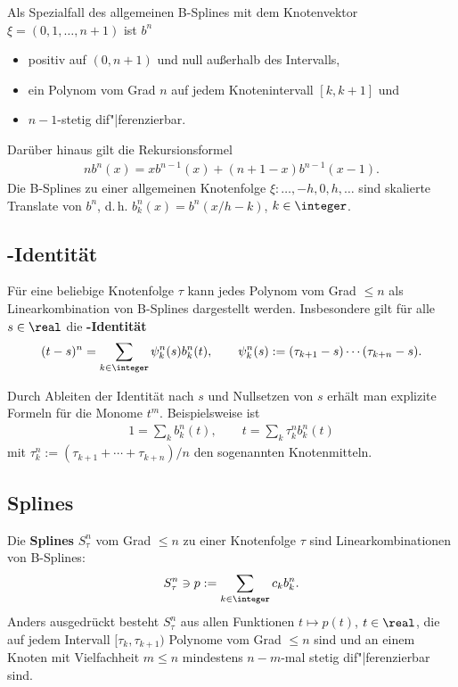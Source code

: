 \linie

Als Spezialfall des allgemeinen B-Splines mit dem Knotenvektor
$\xi = (0, 1, \dotsc, n + 1)$ ist $b^n$
\begin{itemize}
    \item
    positiv auf $(0, n + 1)$ und null außerhalb des Intervalls,

    \item
    ein Polynom vom Grad $n$ auf jedem Knotenintervall $[k, k + 1]$ und

    \item
    $n - 1$-stetig dif"|ferenzierbar.
\end{itemize}
Darüber hinaus gilt die Rekursionsformel
\begin{align*}
    n b^n(x) = x b^{n-1}(x) + (n + 1 - x) b^{n-1}(x - 1).
\end{align*}
Die B-Splines zu einer allgemeinen Knotenfolge
$\xi\colon \dotsc, -h, 0, h, \dotsc$
sind skalierte Translate von $b^n$, d.\,h. $b_k^n(x) = b^n(x/h - k)$,
$k \in \integer$.

\subsection{%
    -Identität%
}

Für eine beliebige Knotenfolge $\tau$ kann jedes Polynom vom Grad $\le n$
als Linearkombination von B-Splines dargestellt werden.
Insbesondere gilt für alle $s \in \real$ die \textbf{-Identität}
\begin{align*}
    (t - s)^n = \sum_{k \in \integer} \psi_k^n(s) b_k^n(t), \qquad
    \psi_k^n(s) := (\tau_{k+1} - s) \dotsm (\tau_{k+n} - s).
\end{align*}

Durch Ableiten der Identität nach $s$ und Nullsetzen von $s$ erhält man
explizite Formeln für die Monome $t^m$.
Beispielsweise ist
\begin{align*}
    1 = \sum_k b_k^n(t), \qquad
    t = \sum_k \tau_k^n b_k^n(t)
\end{align*}
mit $\tau_k^n := (\tau_{k+1} + \dotsb + \tau_{k+n}) / n$ den sogenannten
Knotenmitteln.

\subsection{%
    Splines%
}

Die \textbf{Splines} $S_\tau^n$ vom Grad $\le n$ zu einer Knotenfolge $\tau$
sind Linearkombinationen von B-Splines:
\begin{align*}
    S_\tau^n \ni p := \sum_{k \in \integer} c_k b_k^n.
\end{align*}
Anders ausgedrückt besteht $S_\tau^n$ aus allen Funktionen $t \mapsto p(t)$,
$t \in \real$, die auf jedem Intervall $[\tau_k, \tau_{k+1})$ Polynome
vom Grad $\le n$ sind und an einem Knoten mit Vielfachheit $m \le n$
mindestens $n - m$-mal stetig dif"|ferenzierbar sind.

